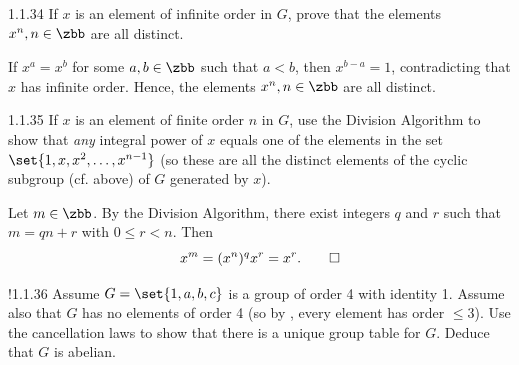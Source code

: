 \begin{exercise}{1.1.34}
    If $x$ is an element of infinite order in $G$, prove that the elements $x^n, n \in \zbb$ are all distinct.
\end{exercise}

\begin{sol}
    If $x^a = x^b$ for some $a, b \in \zbb$ such that $a < b$, then $x^{b - a} = 1$, contradicting that $x$ has infinite order.
	Hence, the elements $x^n, n \in \zbb$ are all distinct.
\end{sol}

\begin{exercise}{1.1.35}
    If $x$ is an element of finite order $n$ in $G$, use the Division Algorithm to show that \emph{any} integral power of $x$ equals one of the elements in the set $\set{1, x, x^2, \dots, x^{n-1}}$ (so these are all the distinct elements of the cyclic subgroup (cf.  above) of $G$ generated by $x$).
\end{exercise}

\begin{sol}
    Let $m \in \zbb$.
    By the Division Algorithm, there exist integers $q$ and $r$ such that $m = qn + r$ with $0 \leq r < n$.
    Then
    \[
        x^m = (x^n)^q x^r = x^r. \qedhere
    \]
\end{sol}

\begin{exercise}!{1.1.36}
    Assume $G = \set{1, a, b, c}$ is a group of order 4 with identity 1.
	Assume also that $G$ has no elements of order 4 (so by , every element has order $\leq 3$).
	Use the cancellation laws to show that there is a unique group table for $G$.
	Deduce that $G$ is abelian.
\end{exercise}

